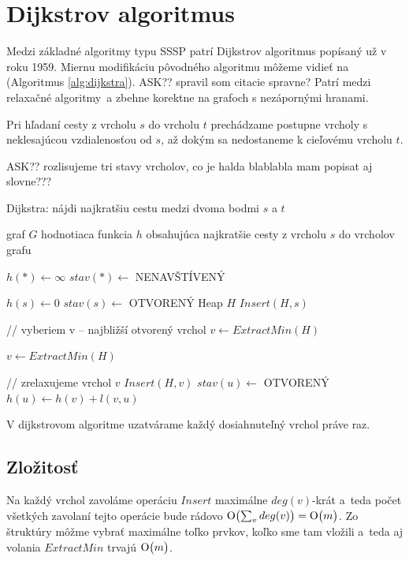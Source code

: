 \section{Dijkstrov algoritmus}
Medzi základné algoritmy typu SSSP patrí Dijkstrov algoritmus \cite{dijkstra59} popísaný už v roku 1959. 
Miernu modifikáciu pôvodného algoritmu môžeme vidieť na (Algoritmus \ref{alg:dijkstra}).  ASK?? spravil som citacie spravne?
Patrí medzi relaxačné algoritmy~a zbehne korektne na grafoch
s nezápornými hranami.

Pri hľadaní cesty z vrcholu $s$ do vrcholu $t$ prechádzame postupne vrcholy s neklesajúcou vzdialenosťou od $s$, až dokým sa nedostaneme k cieľovému vrcholu $t$.


ASK?? rozlisujeme tri stavy vrcholov, co je halda blablabla mam popisat aj slovne???

\begin{algorithm}
\caption{Dijkstra: nájdi najkratšiu cestu medzi dvoma bodmi $s$ a $t$}
\label{alg:dijkstra}
\begin{algorithmic}[1] %
\REQUIRE graf $G$
\ENSURE hodnotiaca funkcia $h$ obsahujúca najkratšie cesty  z vrcholu $s$ do vrcholov grafu


\STATE $ h(*) \leftarrow \infty $
\STATE $ stav(*) \leftarrow$ NENAVŠTÍVENÝ

\STATE $h(s) \leftarrow 0$
\STATE $stav(s) \leftarrow $ OTVORENÝ
\STATE Heap $H$
\STATE $Insert(H, s)$

	
	\STATE // vyberiem v -- najbližší otvorený vrchol
	\STATE $v \leftarrow ExtractMin(H)$
	
		\STATE $v \leftarrow ExtractMin(H)$
	\ENDWHILE
	
	\STATE // zrelaxujeme vrchol $v$
			\STATE $Insert(H, v)$
			\STATE $stav(u) \leftarrow$ OTVORENÝ
			\STATE $h(u) \leftarrow h(v) + l(v, u)$
			
		\ENDIF
	\ENDFOR
\ENDWHILE

\end{algorithmic}
\end{algorithm}

\begin{theorem}
V dijkstrovom algoritme uzatvárame každý dosiahnuteľný vrchol práve raz.
\end{theorem}


\subsection{Zložitosť}
Na každý vrchol zavoláme operáciu $Insert$ maximálne $deg(v)$-krát a~teda počet všetkých zavolaní tejto operácie bude rádovo $\operatorname{O}\bigl(\sum_{v}{deg(v)}\bigr) = \operatorname{O}\bigl(m\bigr)$.
Zo štruktúry môžme vybrať maximálne toľko prvkov, koľko sme tam vložili a~teda aj volania $ExtractMin$ trvajú $\operatorname{O}\bigl(m\bigr)$.

